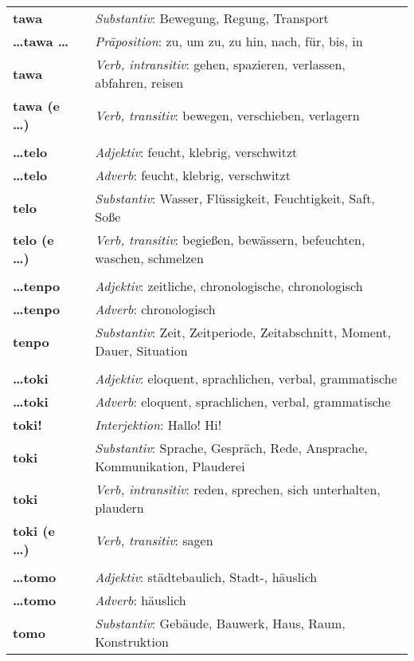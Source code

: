 \begin{supertabular}{p{2,5cm}|ll}
\textbf{tawa} && \textit{Substantiv}: Bewegung, Regung, Transport \\ 
\textbf{\dots tawa \dots} && \textit{Präposition}: zu, um zu, zu hin, nach, für, bis, in \\ 
\textbf{tawa} && \textit{Verb, intransitiv}: gehen, spazieren, verlassen, abfahren, reisen \\ 
\textbf{tawa (e \dots)} && \textit{Verb, transitiv}: bewegen, verschieben, verlagern \\ 
 && \\ %
\textbf{\dots telo} && \textit{Adjektiv}: feucht, klebrig, verschwitzt \\ 
\textbf{\dots telo} && \textit{Adverb}: feucht, klebrig, verschwitzt \\ 
\textbf{telo} && \textit{Substantiv}: Wasser, Flüssigkeit, Feuchtigkeit, Saft, Soße \\ 
\textbf{telo (e \dots)} && \textit{Verb, transitiv}: begießen, bewässern, befeuchten, waschen, schmelzen \\ 
 && \\ %
\textbf{\dots tenpo} && \textit{Adjektiv}: zeitliche, chronologische, chronologisch \\ 
\textbf{\dots tenpo} && \textit{Adverb}: chronologisch \\ 
\textbf{tenpo} && \textit{Substantiv}: Zeit, Zeitperiode, Zeitabschnitt, Moment, Dauer, Situation \\ 
 && \\ %
\textbf{\dots toki} && \textit{Adjektiv}: eloquent, sprachlichen, verbal, grammatische \\ 
\textbf{\dots toki} && \textit{Adverb}: eloquent, sprachlichen, verbal, grammatische \\ 
\textbf{toki!} && \textit{Interjektion}: Hallo! Hi! \\ 
\textbf{toki} && \textit{Substantiv}: Sprache, Gespräch, Rede, Ansprache, Kommunikation, Plauderei \\ 
\textbf{toki} && \textit{Verb, intransitiv}: reden, sprechen, sich unterhalten, plaudern \\ 
\textbf{toki (e \dots)} && \textit{Verb, transitiv}: sagen \\ 
 && \\ %
\textbf{\dots tomo} && \textit{Adjektiv}: städtebaulich, Stadt-, häuslich \\ 
\textbf{\dots tomo} && \textit{Adverb}: häuslich \\ 
\textbf{tomo} && \textit{Substantiv}: Gebäude, Bauwerk, Haus, Raum, Konstruktion \\ 

\end{supertabular}

